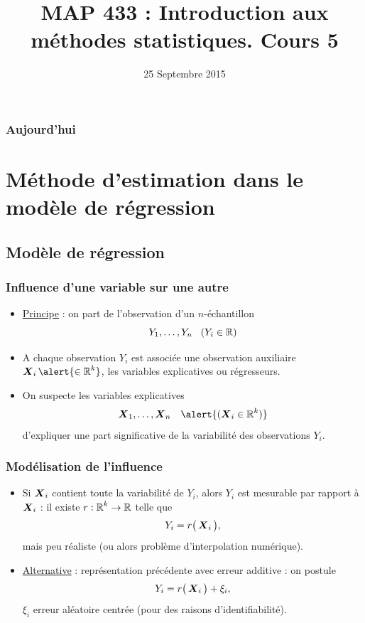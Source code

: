


\title{MAP 433 : Introduction aux méthodes statistiques. Cours 5}

\date{25 Septembre 2015}
\maketitle



\begin{frame}
\frametitle{Aujourd'hui}
\tableofcontents
\end{frame}


\section{Méthode d'estimation dans le modèle de régression}

\subsection{Modèle de régression}

\begin{frame}
\frametitle{Influence d'une variable sur une autre}
\begin{itemize}
\item \underline{Principe} : on part de \alert{l'observation} d'un $n$-échantillon
$$Y_1,\ldots, Y_n\;\;\;(Y_i \in \operatorname{{\mathbb R}})$$
\item A chaque observation $Y_i$ est associée une \alert{observation auxiliaire} $\bX_i \alert{ \in \R^k}$, les \alert{variables explicatives} ou \alert{régresseurs}.
\item On suspecte les variables explicatives
$$\bX_1,\ldots, \bX_n\;\;\;\alert{ (\bX_i \in \R^k)}$$
d'expliquer une part significative de la variabilité des observations $Y_i$.
\end{itemize}
\end{frame}

\begin{frame}
\frametitle{Modélisation de l'influence}
\begin{itemize}
\item Si $\operatorname{\boldsymbol{X}}_i$ contient \alert{toute la variabilité} de $Y_i$, alors $Y_i$ est mesurable par rapport à $\operatorname{\boldsymbol{X}}_i$ : il existe $r:\operatorname{{\mathbb R}}^k\rightarrow \operatorname{{\mathbb R}}$ telle que
$$Y_i = r\big(\operatorname{\boldsymbol{X}}_i\big),$$
mais peu réaliste (ou alors \alert{problème d'interpolation
numérique}).
\item \underline{Alternative} : représentation précédente avec \alert{ erreur additive} : on \alert{ postule}
$$Y_i = r\big(\operatorname{\boldsymbol{X}}_i\big)+\xi_i,$$
$\xi_i$ erreur aléatoire centrée (pour des raisons d'identifiabilité).
\end{itemize}
\end{frame}

